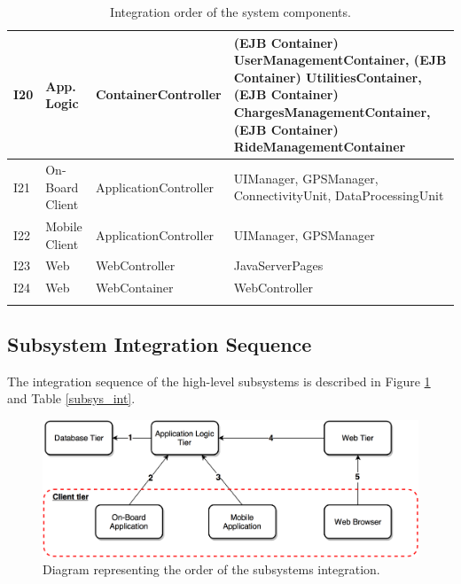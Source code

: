 \begin{longtable}{p{} | p{} | p{} | p{}}
\hline
I20 & App. Logic & ContainerController & (EJB Container) UserManagementContainer, (EJB Container) UtilitiesContainer, (EJB Container) ChargesManagementContainer, (EJB Container) RideManagementContainer \\
\hline
I21 & On-Board Client & ApplicationController & UIManager, GPSManager, ConnectivityUnit, DataProcessingUnit \\
\hline
I22 & Mobile Client & ApplicationController & UIManager, GPSManager \\
\hline
I23 & Web & WebController & JavaServerPages \\
\hline
I24 & Web & WebContainer & WebController \\
\hline
\caption{Integration order of the system components.}
\label{software_int}
\end{longtable}

\subsection{Subsystem Integration Sequence}
The integration sequence of the high-level subsystems is described in Figure \ref{h_level_subsys} and Table \ref{subsys_int}.

\begin{figure}[H]
\begin{center}
		\includegraphics[width=\textwidth]{./integration_strategy/diagrams/h_level_subsys.png}
		\caption{Diagram representing the order of the subsystems integration.}
		\label{h_level_subsys}
\end{center}
\end{figure}

